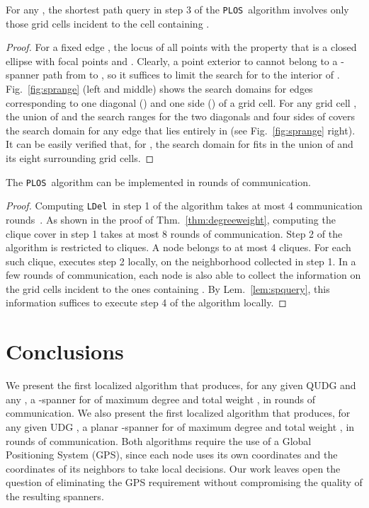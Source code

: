 \documentclass{llncs}
\newcommand{\ABox}{
\raisebox{3pt}{\framebox[6pt]{\rule{6pt}{0pt}}}
}
\newcommand{\palg}{{\tt PLOS}}
\newcommand{\ldel}{{\tt LDel}}
\begin{document}
\begin{lemma}
For any , the shortest path query  in step 3 of the \palg\ algorithm involves
only those grid cells incident to the cell  containing .
\label{lem:spquery}
\end{lemma}
\begin{proof}
For a fixed edge , the locus of all points  with the property that  is a closed ellipse  with focal points  and . Clearly, a point exterior to  cannot belong to a -spanner path  from  to , so it suffices to limit the search for  to the interior of . Fig.~\ref{fig:sprange} (left and middle) shows the search domains for edges corresponding to one diagonal () and one side () of a grid cell. For any grid cell , the union of  and the search ranges for the two diagonals and four sides of  covers the search domain for any edge that lies entirely in  (see Fig.~\ref{fig:sprange} right). It can be easily verified that, for , the search domain for  fits in the union of  and its eight surrounding grid cells. \hfill\ABox
\end{proof}

\begin{theorem}
The \palg\ algorithm can be implemented in  rounds of communication.
\label{thm:communication}
\end{theorem}
\begin{proof}
Computing \ldel\ in step 1 of the algorithm takes at most 4 communication rounds~\cite{LCWW03}. As shown in the proof of Thm.~\ref{thm:degreeweight}, computing the clique cover in step 1 takes at most 8 rounds of communication.
Step 2 of the algorithm is restricted to cliques. A node  belongs to at most 4 cliques. For each such clique,  executes step 2 locally, on the neighborhood collected in step 1.
In a few rounds of communication, each node  is also able to collect the information on the grid cells incident to the ones containing . By Lem.~\ref{lem:spquery}, this information suffices to execute step 4 of the algorithm locally. \hfill\ABox
\end{proof}

\section{Conclusions}
We present the first localized algorithm that produces, for any given QUDG  and any , a
-spanner for  of maximum degree  and total weight , in  rounds of communication.
We also present the first localized algorithm that produces, for any given UDG , a planar
-spanner for  of maximum degree  and total weight , in  rounds of communication.
Both algorithms require the use of a Global Positioning System (GPS), since each node uses its own
coordinates and the coordinates of its neighbors to take local decisions. Our work leaves open the
question of eliminating the GPS requirement without compromising the quality of the
resulting spanners.
\end{document}
